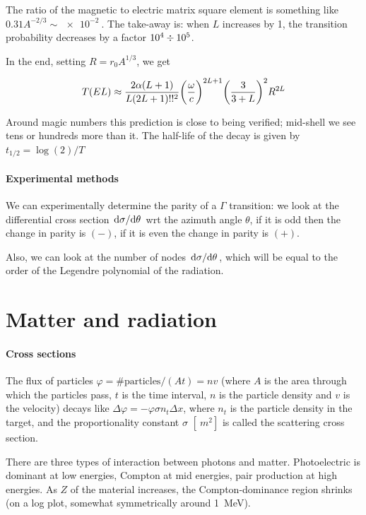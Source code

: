 \documentclass{article}
\begin{document}
The ratio of the magnetic to electric matrix square element is something like \(0.31A^{-2/3} \sim \SI{e-2}{} \). The take-away is: when \(L\) increases by 1, the transition probability decreases by a factor \(\SI{e4}{} \divisionsymbol \SI{e5}{} \).

In the end, setting \(R = r_0 A^{1/3}\), we get

\begin{equation}
    T(E L ) \approx
    \frac{2 \alpha (L+1)}{L (2L+1)!!^2} \qty(\frac{\omega}{c})^{2L+1} \qty(\frac{3}{3+L})^2 R^{2L}
\end{equation}

Around magic numbers this prediction is close to being verified; mid-shell we see tens or hundreds more than it. The half-life of the decay is given by \(t_{1/2} = \log(2)/T  \)

\paragraph{Experimental methods}

We can experimentally determine the parity of a \(\Gamma\) transition: we look at the differential cross section \(\dv*{\sigma}{\theta} \) wrt the azimuth angle \(\theta\), if it is odd then the change in parity is \((-)\), if it is even the change in parity is \((+)\).

Also, we can look at the number of nodes \(\dv*{\sigma}{\theta} \), which will be equal to the order of the Legendre polynomial of the radiation.

\section{Matter and radiation}

\paragraph{Cross sections}

The flux of particles \(\varphi = \# \text{particles} / (A t) = nv\) (where \(A\) is the area through which the particles pass, \(t\) is the time interval, \(n\) is the particle density and \(v\) is the velocity) decays like \(\Delta \varphi = - \varphi \sigma n_t \Delta x\), where \(n_t\) is the particle density in the target, and the proportionality constant \(\sigma\) \([\SI{}{m^2} ]\) is called the scattering cross section.

There are three types of interaction between photons and matter. Photoelectric is dominant at low energies, Compton at mid energies, pair production at high energies. As \(Z\) of the material increases, the Compton-dominance region shrinks (on a log plot, somewhat symmetrically around \SI{1}{MeV}).
\end{document}
